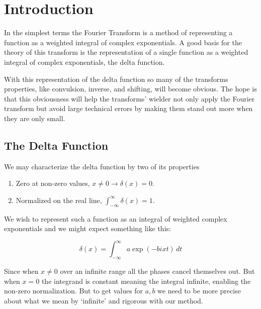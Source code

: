 \chapter{Introduction}

In the simplest terms the Fourier Transform is a method of representing a function as a weighted integral of complex exponentials.
A good basis for the theory of this transform is the representation of a single function as a weighted integral of complex exponentials, the delta function.

With this representation of the delta function so many of the transforms properties, like convulsion, inverse, and shifting, will become obvious.
The hope is that this obviousness will help the transforms' wielder not only apply the Fourier transform but avoid large technical errors by making them stand out more when they are only small.

\section{The Delta Function}
We may characterize the delta function by two of its properties
\begin{enumerate}
\item Zero at non-zero values, $x\neq 0 \rightarrow \delta(x) = 0$.
\item Normalized on the real line, $\int_{-\infty}^{\infty}\delta(x) = 1$.
\end{enumerate}

We wish to represent such a function as an integral of weighted complex exponentials and we might expect something like this:

\[\delta(x) = \int_{-\infty}^{\infty}a\exp(-bixt)\,dt\]

Since when $x\neq 0$ over an infinite range all the phases cancel themselves out.
But when $x=0$ the integrand is constant meaning the integral infinite, enabling the non-zero normalization.
But to get values for $a,b$ we need to be more precise about what we mean by `infinite' and rigorous with our method.
\\

